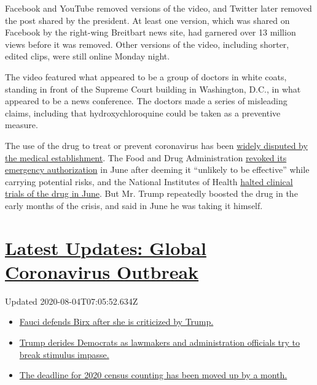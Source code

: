 Facebook and YouTube removed versions of the video, and Twitter later
removed the post shared by the president. At least one version, which
was shared on Facebook by the right-wing Breitbart news site, had
garnered over 13 million views before it was removed. Other versions of
the video, including shorter, edited clips, were still online Monday
night.

The video featured what appeared to be a group of doctors in white
coats, standing in front of the Supreme Court building in Washington,
D.C., in what appeared to be a news conference. The doctors made a
series of misleading claims, including that hydroxychloroquine could be
taken as a preventive measure.

The use of the drug to treat or prevent coronavirus has been
\href{https://www.nytimes.com/article/hydroxychloroquine-coronavirus.html}{widely
disputed by the medical establishment}. The Food and Drug Administration
\href{https://www.fda.gov/media/138945/download}{revoked its emergency
authorization} in June after deeming it ``unlikely to be effective''
while carrying potential risks, and the National Institutes of Health
\href{https://www.nytimes.com/2020/06/20/health/hydroxychloroquine-coronavirus-trial.html}{halted
clinical trials of the drug in June}. But Mr. Trump repeatedly boosted
the drug in the early months of the crisis, and said in June he was
taking it himself.

\hypertarget{latest-updates-global-coronavirus-outbreak}{%
\section{\texorpdfstring{\href{https://www.nytimes.com/2020/08/03/world/coronavirus-covid-19.html?action=click\&pgtype=Article\&state=default\&region=MAIN_CONTENT_1\&context=storylines_live_updates}{Latest
Updates: Global Coronavirus
Outbreak}}{Latest Updates: Global Coronavirus Outbreak}}\label{latest-updates-global-coronavirus-outbreak}}

Updated 2020-08-04T07:05:52.634Z

\begin{itemize}
\tightlist
\item
  \href{https://www.nytimes.com/2020/08/03/world/coronavirus-covid-19.html?action=click\&pgtype=Article\&state=default\&region=MAIN_CONTENT_1\&context=storylines_live_updates\#link-4547638f}{Fauci
  defends Birx after she is criticized by Trump.}
\item
  \href{https://www.nytimes.com/2020/08/03/world/coronavirus-covid-19.html?action=click\&pgtype=Article\&state=default\&region=MAIN_CONTENT_1\&context=storylines_live_updates\#link-15e7f995}{Trump
  derides Democrats as lawmakers and administration officials try to
  break stimulus impasse.}
\item
  \href{https://www.nytimes.com/2020/08/03/world/coronavirus-covid-19.html?action=click\&pgtype=Article\&state=default\&region=MAIN_CONTENT_1\&context=storylines_live_updates\#link-e5a2cda}{The
  deadline for 2020 census counting has been moved up by a month.}
\end{itemize}

